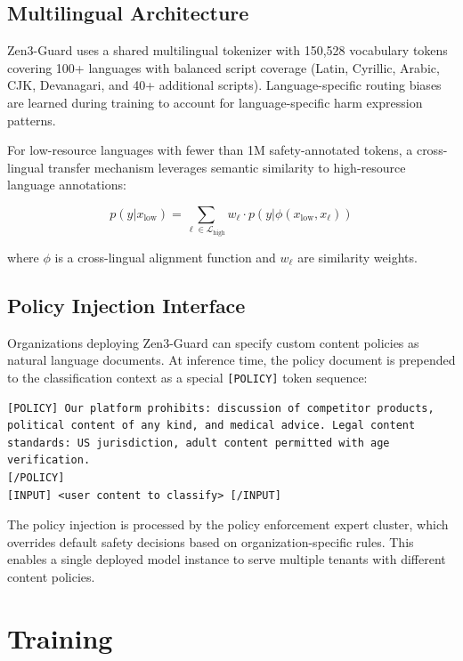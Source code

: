 \documentclass[11pt,a4paper]{article}
\begin{document}
\subsection{Multilingual Architecture}

Zen3-Guard uses a shared multilingual tokenizer with 150,528 vocabulary tokens covering
100+ languages with balanced script coverage (Latin, Cyrillic, Arabic, CJK, Devanagari,
and 40+ additional scripts). Language-specific routing biases are learned during
training to account for language-specific harm expression patterns.

For low-resource languages with fewer than 1M safety-annotated tokens, a
cross-lingual transfer mechanism leverages semantic similarity to high-resource
language annotations:

\begin{equation}
p(y | x_{\text{low}}) = \sum_{\ell \in \mathcal{L}_{\text{high}}} w_\ell \cdot p(y | \phi(x_{\text{low}}, x_\ell))
\end{equation}

where $\phi$ is a cross-lingual alignment function and $w_\ell$ are similarity weights.

\subsection{Policy Injection Interface}

Organizations deploying Zen3-Guard can specify custom content policies as natural
language documents. At inference time, the policy document is prepended to the
classification context as a special \texttt{[POLICY]} token sequence:

\begin{verbatim}
[POLICY] Our platform prohibits: discussion of competitor products,
political content of any kind, and medical advice. Legal content
standards: US jurisdiction, adult content permitted with age verification.
[/POLICY]
[INPUT] <user content to classify> [/INPUT]
\end{verbatim}

The policy injection is processed by the policy enforcement expert cluster, which
overrides default safety decisions based on organization-specific rules. This enables
a single deployed model instance to serve multiple tenants with different content policies.

\section{Training}
\label{sec:training}
\end{document}
